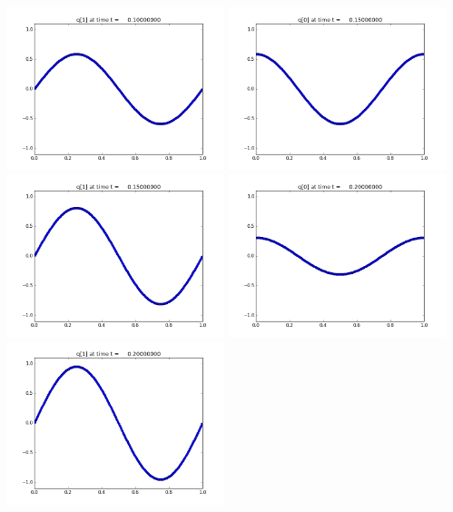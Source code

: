 \documentclass[11pt]{article}
\begin{document}
\includegraphics[width=0.475\textwidth]{frame0002fig1.png}
\vskip 10pt 
\includegraphics[width=0.475\textwidth]{frame0003fig0.png}
\includegraphics[width=0.475\textwidth]{frame0003fig1.png}
\vskip 10pt 
\includegraphics[width=0.475\textwidth]{frame0004fig0.png}
\includegraphics[width=0.475\textwidth]{frame0004fig1.png}
\end{document}

